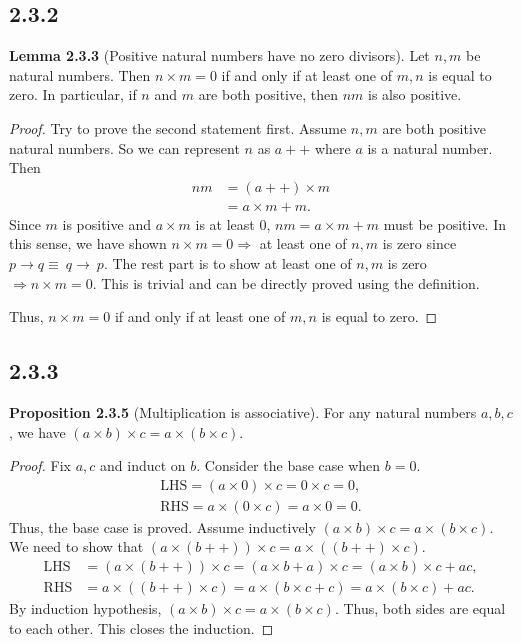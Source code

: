 \documentclass[12pt, letter]{article}
\begin{document}
\subsection*{2.3.2}
\textbf{Lemma 2.3.3} (Positive natural numbers have no zero divisors). Let $n,m$ be natural numbers. Then $n\times m=0$ if and only if at least one of $m,n$ is equal to zero. In particular, if $n$ and $m$ are both positive, then $nm$ is also positive.
\begin{proof}
    Try to prove the second statement first. Assume $n,m$ are both positive natural numbers. So we can represent $n$ as $a++$ where $a$ is a natural number. Then 
    \begin{equation*}
        \begin{aligned}
            nm&=(a++)\times m\\
            &=a\times m+m.
        \end{aligned}
    \end{equation*}
    Since $m$ is positive and $a\times m$ is at least 0, $nm=a\times m+m$ must be positive. In this sense, we have shown $n\times m=0\Rightarrow$ at least one of $n,m$ is zero since\\ 
    $p\rightarrow q\equiv ~q\rightarrow ~p$. The rest part is to show at least one of $n,m$ is zero $\Rightarrow n\times m=0$. This is trivial and can be directly proved using the definition. 

    Thus, $n\times m=0$ if and only if at least one of $m,n$ is equal to zero.
\end{proof}
\subsection*{2.3.3}
\textbf{Proposition 2.3.5} (Multiplication is associative). For any natural numbers $a,b,c$, we have $(a\times b)\times c=a\times (b\times c)$.
\begin{proof}
    Fix $a,c$ and induct on $b$. Consider the base case when $b=0$. 
    \begin{equation*}
        \begin{aligned}
            \text{LHS}=(a\times 0)\times c=0\times c=0,\\
            \text{RHS}=a\times(0\times c)=a\times 0=0.
        \end{aligned}
    \end{equation*}
    Thus, the base case is proved. Assume inductively $(a\times b)\times c=a\times(b\times c)$. We need to show that $(a\times(b++))\times c=a\times((b++)\times c)$.
    \begin{equation*}
        \begin{aligned}
            \text{LHS}&=(a\times(b++))\times c=(a\times b+a)\times c=(a\times b)\times c+ac,\\
            \text{RHS}&=a\times ((b++)\times c)=a\times(b\times c+c)=a\times (b\times c)+ac.
        \end{aligned}
    \end{equation*}
    By induction hypothesis, $(a\times b)\times c=a\times(b\times c)$. Thus, both sides are equal to each other. This closes the induction.
\end{proof}
\end{document}
